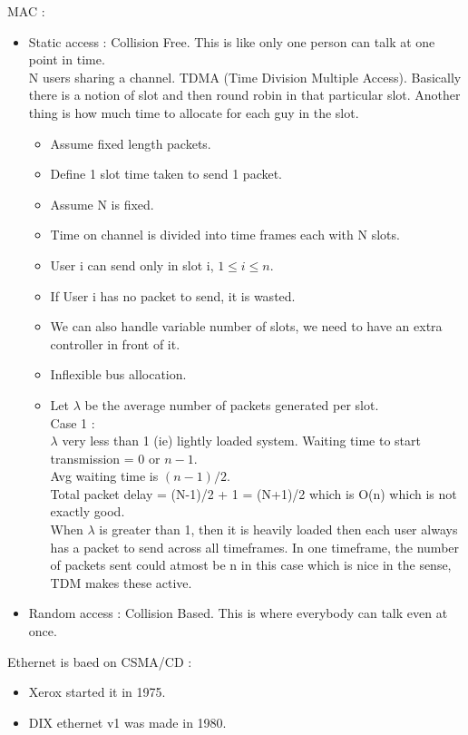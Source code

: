 \documentclass[solution,addpoints,12pt]{exam}
\begin{document}
MAC :\\
\begin{itemize}
\item Static access : Collision Free. This is like
only one person can talk at one point in time.\\

N users sharing a channel.
TDMA (Time Division Multiple Access). Basically
there is a notion of slot and then round robin
in that particular slot. Another thing is how
much time to allocate for each guy in the slot.\\

\begin{itemize}
\item Assume fixed length packets.
\item Define 1 slot time taken to send 1 packet.
\item Assume N is fixed.
\item Time on channel is divided into time frames each with N slots.
\item User i can send only in slot i, $1 \le i \le n$.
\item If User i has no packet to send, it is wasted.
\item We can also handle variable number of slots, we need
to have an extra controller in front of it.
\item Inflexible bus allocation.
\item Let $\lambda$ be the average number of packets generated
per slot.\\
Case 1 :\\
$\lambda$ very less than 1 (ie) lightly loaded system.
Waiting time to start transmission = 0 or $n-1$.\\
Avg waiting time is $(n-1)/2$.\\
Total packet delay = (N-1)/2 + 1 = (N+1)/2 which
is O(n) which is not exactly good.\\

When $\lambda$ is greater than 1, then it is heavily
loaded then each user always has a packet to send
across all timeframes. In one timeframe,
the number of packets sent could atmost be n in this
case which is nice in the sense, TDM makes these active.

\end{itemize}
\item Random access : Collision Based. This is
where everybody can talk even at once.
\end{itemize}
Ethernet is baed on CSMA/CD :\\
\begin{itemize}
\item Xerox started it in 1975.
\item DIX ethernet v1 was made in 1980.
\end{itemize}
\end{document}
